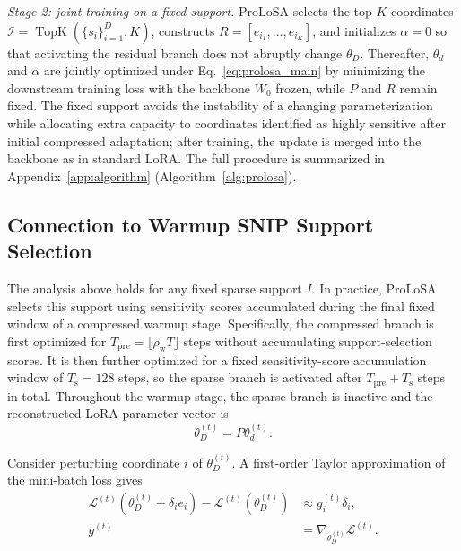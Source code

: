 \emph{Stage 2: joint training on a fixed support.}
{ProLoSA} selects the top-$K$ coordinates $\mathcal{I}=\operatorname{TopK}(\{s_i\}_{i=1}^{D},K)$, constructs $R=[e_{i_1},\ldots,e_{i_K}]$, and initializes $\alpha=0$ so that activating the residual branch does not abruptly change $\theta_D$.
Thereafter, $\theta_d$ and $\alpha$ are jointly optimized under Eq.~\eqref{eq:prolosa_main} by minimizing the downstream training loss with the backbone $W_0$ frozen, while $P$ and $R$ remain fixed.
The fixed support avoids the instability of a changing parameterization while allocating extra capacity to coordinates identified as highly sensitive after initial compressed adaptation; after training, the update is merged into the backbone as in standard LoRA.
The full procedure is summarized in Appendix~\ref{app:algorithm} (Algorithm~\ref{alg:prolosa}).

\subsection{Connection to Warmup SNIP Support Selection}
\label{app:warmup_snip}

The analysis above holds for any fixed sparse support $I$.
In practice, ProLoSA selects this support using sensitivity scores accumulated during the final fixed window of a compressed warmup stage.
Specifically, the compressed branch is first optimized for
$T_{\mathrm{pre}}=\lfloor\rho_{\mathrm{w}}T\rfloor$
steps without accumulating support-selection scores.
It is then further optimized for a fixed sensitivity-score accumulation window of
$T_{\mathrm{s}}=128$ steps, so the sparse branch is activated after $T_{\mathrm{pre}}+T_{\mathrm{s}}$ steps in total.
Throughout the warmup stage, the sparse branch is inactive and the reconstructed LoRA parameter vector is
\begin{equation}
\theta_D^{(t)}=P\theta_d^{(t)} .
\label{eq:app_warmup_reconstruction}
\end{equation}

Consider perturbing coordinate $i$ of $\theta_D^{(t)}$.
A first-order Taylor approximation of the mini-batch loss gives
\begin{equation}
\begin{aligned}
\mathcal{L}^{(t)}(\theta_D^{(t)}+\delta_i e_i)
-
\mathcal{L}^{(t)}(\theta_D^{(t)})
&\approx
g_i^{(t)}\delta_i, \\
g^{(t)}
&=
\nabla_{\theta_D^{(t)}}\mathcal{L}^{(t)} .
\end{aligned}
\label{eq:app_first_order_perturbation}
\end{equation}

